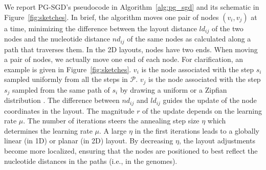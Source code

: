 \documentclass{bioinfo}
\theoremstyle{definition}
\begin{document}
	We report PG-SGD's pseudocode in Algorithm~\ref{alg:pg_sgd} and its schematic in Figure~\ref{fig:sketches}.
	In brief, the algorithm moves one pair of nodes $( v_i, v_j )$ at a time, minimizing the difference between the layout distance $ld_{ij}$ of the two nodes and the nucleotide distance $nd_{ij}$ of the same nodes as calculated along a path that traverses them.
	In the 2D layouts, nodes have two ends.
	When moving a pair of nodes, we actually move one end of each node. For clarification, an example is given in Figure~\ref{fig:sketches}.
	$v_i$ is the node associated with the step $s_i$ sampled uniformly from all the steps in $\mathcal{P}$.
	$v_j$ is the node associated with the step $s_j$ sampled from the same path of $s_i$ by drawing a uniform or a Zipfian distribution \citep{Zipf1932}.
	The difference between $nd_{ij}$ and $ld_{ij}$ guides the update of the node coordinates in the layout.
	The magnitude $r$ of the update depends on the learning rate $\mu$.
	The number of iterations steers the annealing step size $\eta$ which determines the learning rate $\mu$.
	A large $\eta$ in the first iterations leads to a globally linear (in 1D) or planar (in 2D) layout.
	By decreasing $\eta$, the layout adjustments become more localized, ensuring that the nodes are positioned to best reflect the nucleotide distances in the paths (i.e., in the genomes).

	

\end{document}
